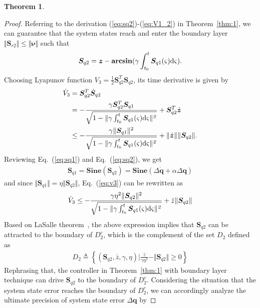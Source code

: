 \documentclass[3p]{elsarticle}
\theoremstyle{plain}
\newtheorem{mythm}{Theorem}
\theoremstyle{remark}
\begin{document}
{\begin{mythm}
\end{mythm}
\begin{proof}
Referring to the derivation (\ref{eq:sq2})-(\ref{eq:V1_2}) in Theorem~\ref{thm:1}, we can guarantee that the system states reach and enter the boundary layer $\Vert\bm{ S}_{r2}\Vert \le \Vert\bm\nu\Vert$ such that
\begin{align}
\bm S_{q2}=\bm z-\mathbf{arcsin}(\gamma\int^t_{t_0}\bm S_{q1}(\varsigma) \rm{d}\it{\varsigma}).
\end{align}
Choosing Lyapunov function $V_3=\frac{1}{2}\bm{ S}_{q2}^T\bm{ S}_{q2}$, its time derivative is given by
\begin{align}\begin{split}
\dot V_3&=\bm{ S}_{q2}^T\dot{\bm{S}}_{q2}\\
&=-\frac{\gamma \bm S_{q2}^T\bm S_{q1}}{\sqrt{1-\Vert\gamma\int^t_{t_0}\bm S_{q1}(\varsigma) \rm{d}\it{\varsigma\Vert^2}}}+\bm{ S}_{q2}^T\dot{\bm z}\\
&\le -\frac{\gamma \Vert \bm S_{q1}\Vert^2}{\sqrt{1-\Vert\gamma\int^t_{t_0}\bm S_{q1}(\varsigma) \rm{d}\it{\varsigma\Vert^2}}}+\Vert\dot{\bm{z}}\Vert\Vert\bm{ S}_{q2}\Vert.\label{eq:v3}
\end{split}\end{align}
Reviewing Eq.~(\ref{eq:sq1}) and Eq.~(\ref{eq:sq2}), we get
\begin{align}
\bm S_{q1}=\mathbf{Sine}(\bm S_{q2})=\mathbf{Sine}(\Delta\dot{\bm q}+\alpha\Delta\bm q)
\end{align}
and since $\Vert\bm S_{q1}\Vert=\eta\Vert\bm S_{q2}\Vert$, Eq.~(\ref{eq:v3}) can be rewritten as
\begin{align}
  \dot V_3\le -\frac{\gamma\eta^2 \Vert \bm S_{q2}\Vert^2}{\sqrt{1-\Vert\gamma\int^t_{t_0}\bm S_{q1}(\varsigma) \rm{d}\it{\varsigma\Vert^2}}}+\bar{z}\Vert\bm{ S}_{q2}\Vert
\end{align}
Based on LaSalle theorem~\cite{lasalle1960some}, the above expression implies that $\bm S_{q2}$ can be attracted to the boundary of $D_2^c$, which is the complement of the set $D_2$ defined as
\begin{align}
  D_2\triangleq\left\{(\bm S_{q2},\bar z,\gamma,\eta)\Big\vert \frac{\bar z}{\gamma\eta^2}-\Vert \bm S_{q2}\Vert\ge 0\right\}
\end{align}
Rephrasing that, the controller in Theorem~\ref{thm:1} with boundary layer technique can drive $\bm S_{q2}$ to the boundary of $D_2^c$. Considering the situation that the system state error reaches the boundary of $D_2^c$, we can accordingly analyze the ultimate precision of system state error $\Delta\bm q$ by

\end{proof}}
\end{document}
